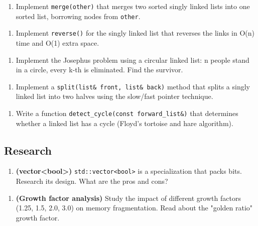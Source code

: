 \begin{enumerate}
\item Implement \texttt{merge(other)} that merges two sorted singly linked lists into one sorted list, borrowing nodes from \texttt{other}.
\end{enumerate}

\begin{enumerate}
\item Implement \texttt{reverse()} for the singly linked list that reverses the links in O(n) time and O(1) extra space.
\end{enumerate}

\begin{enumerate}
\item Implement the Josephus problem using a circular linked list: n people stand in a circle, every k-th is eliminated. Find the survivor.
\end{enumerate}

\begin{enumerate}
\item Implement a \texttt{split(list\& front, list\& back)} method that splits a singly linked list into two halves using the slow/fast pointer technique.
\end{enumerate}

\begin{enumerate}
\item Write a function \texttt{detect\_cycle(const forward\_list\&)} that determines whether a linked list has a cycle (Floyd's tortoise and hare algorithm).
\end{enumerate}

\subsection{Research}

\begin{enumerate}
\item \textbf{(vector<bool>)} \texttt{std::vector<bool>} is a specialization that packs bits. Research its design. What are the pros and cons?
\end{enumerate}

\begin{enumerate}
\item \textbf{(Growth factor analysis)} Study the impact of different growth factors (1.25, 1.5, 2.0, 3.0) on memory fragmentation. Read about the "golden ratio" growth factor.
\end{enumerate}

